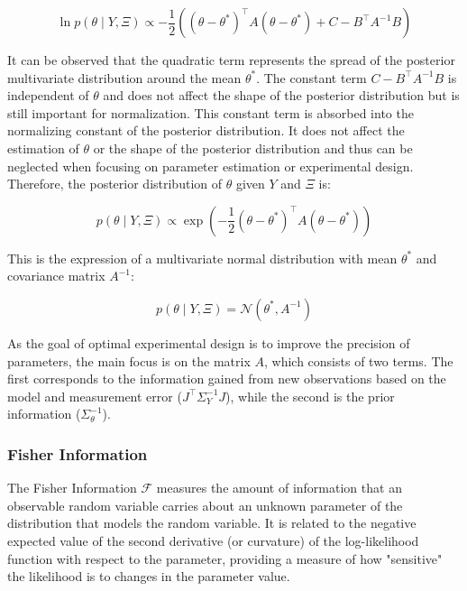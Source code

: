 \documentclass[../Article_Design_of_Experiment.tex]{subfiles}
\begin{document}
	{\footnotesize 
		\begin{equation} 
			\ln p\left(\theta \mid Y, \Xi \right) \propto -\frac{1}{2} \left( \left( \theta - \theta^* \right)^\top A \left( \theta - \theta^* \right) + C - B^\top A^{-1} B \right) 
		\end{equation} }
	
	It can be observed that the quadratic term represents the spread of the posterior multivariate distribution around the mean $\theta^*$. The constant term $C - B^\top A^{-1} B$ is independent of $\theta$ and does not affect the shape of the posterior distribution but is still important for normalization. This constant term is absorbed into the normalizing constant of the posterior distribution. It does not affect the estimation of $\theta$ or the shape of the posterior distribution and thus can be neglected when focusing on parameter estimation or experimental design. Therefore, the posterior distribution of $\theta$ given $Y$ and $\Xi$ is:
	
	{\footnotesize \begin{equation} p\left(\theta \mid Y, \Xi \right) \propto \exp \left( -\frac{1}{2} \left( \theta - \theta^* \right)^\top A \left( \theta - \theta^* \right) \right) \end{equation} }
	
	This is the expression of a multivariate normal distribution with mean $\theta^*$ and covariance matrix $A^{-1}$:
	
	{\footnotesize \begin{equation} p\left(\theta \mid Y, \Xi \right) = \mathcal{N}\left( \theta^*, A^{-1} \right) \end{equation} }
	
	As the goal of optimal experimental design is to improve the precision of parameters, the main focus is on the matrix $A$, which consists of two terms. The first corresponds to the information gained from new observations based on the model and measurement error ($J^\top \Sigma_Y^{-1} J$), while the second is the prior information ($\Sigma_\theta^{-1}$).
	
	\subsubsection{Fisher Information}
	
	The Fisher Information $\mathcal{F}$ measures the amount of information that an observable random variable carries about an unknown parameter of the distribution that models the random variable. It is related to the negative expected value of the second derivative (or curvature) of the log-likelihood function with respect to the parameter, providing a measure of how "sensitive" the likelihood is to changes in the parameter value.
	
\end{document}
